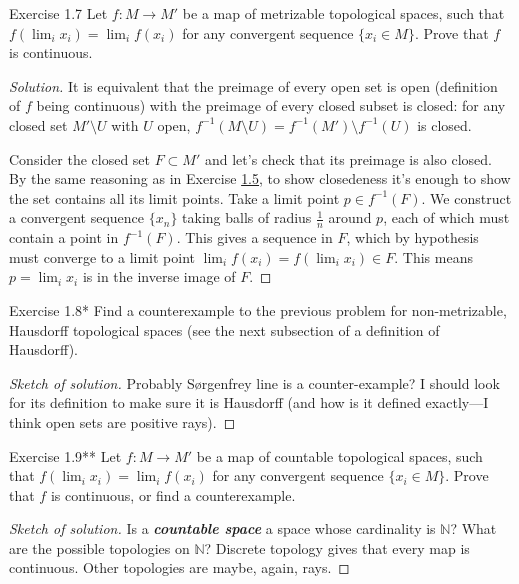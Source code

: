\begin{thing4}{Exercise 1.7}\label{exer:1.7}\leavevmode
Let $f:M\to M'$ be a map of metrizable topological spaces, such that $f \left( \lim_{i} x_i \right) =\lim_{i} f(x_i)$ for any convergent sequence $\{x_i \in M\}$. Prove that $f$ is continuous.	
\end{thing4}

\begin{proof}[Solution]\leavevmode
It is equivalent that the preimage of every open set is open (definition of $f$ being continuous) with the preimage of every closed subset is closed: for any closed set $M'\setminus U$ with $U$ open, $f^{-1}(M\setminus U)=f^{-1}(M')\setminus f^{-1}(U)$ is closed.

Consider the closed set $F\subset M'$ and let's check that its preimage is also closed. By the same reasoning as in Exercise \hyperref[exer:1.5]{1.5}, to show closedeness it's enough to show the set contains all its limit points. Take a limit point $p\in f^{-1}(F)$. We construct a convergent sequence $\{x_n\}$ taking balls of radius $\frac{1}{n}$ around $p$, each of which must contain a point in $f^{-1}(F)$. This gives a sequence in $F$, which by hypothesis must converge to a limit point $\lim_{i} f(x_i)=f\left(\lim_i x_i\right) \in F$. This means $p=\lim_{i} x_i$ is in the inverse image of $F$.
\end{proof}

\begin{thing4}{Exercise 1.8*}\leavevmode
	Find a counterexample to the previous problem for non-metrizable, Hausdorff topological spaces (see the next subsection of a definition of Hausdorff).
\end{thing4}

\begin{proof}[{\color{2}Sketch of solution}]\leavevmode
Probably Sørgenfrey line is a counter-example? I should look for its definition to make sure it is Hausdorff (and how is it defined exactly---I think open sets are positive rays).
\end{proof}

\begin{thing4}{Exercise 1.9**}\leavevmode
	Let $f: M\longrightarrow M'$ be a map of countable topological spaces, such that $f(\lim_{i} x_i)=\lim_{i} f(x_i)$ for any convergent sequence $\{ x_i \in M\}$. Prove that $f$ is continuous, or find a counterexample.
\end{thing4}

\begin{proof}[{\color{2}Sketch of solution}]\leavevmode
	Is a \textit{\textbf{countable space}} a space whose cardinality is $\mathbb{N}$? What are the possible topologies on $\mathbb{N}$? Discrete topology gives that every map is continuous. Other topologies are maybe, again, rays.
\end{proof}

